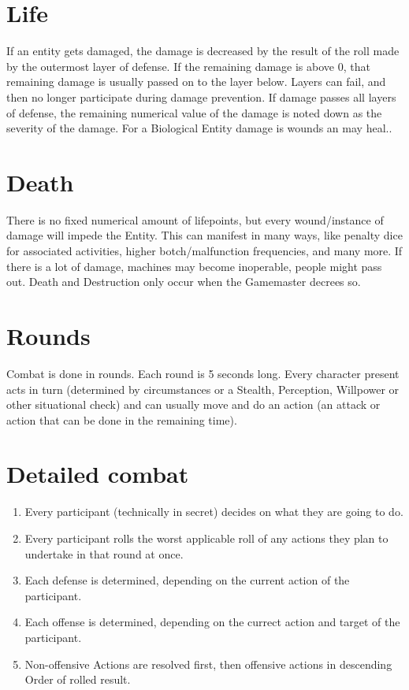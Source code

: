 \section{Life}\label{sec:life}
If an entity gets damaged, the damage is decreased by the result of the roll made by the outermost layer of defense.
If the remaining damage is above 0, that remaining damage is usually passed on to the layer below.
Layers can fail, and then no longer participate during damage prevention.
If damage passes all layers of defense,
the remaining numerical value of the damage is noted down as the severity of the damage.
For a Biological Entity damage is wounds an may heal..
\section{Death}\label{sec:death}
There is no fixed numerical amount of lifepoints, but every wound/instance of damage will impede the Entity.
This can manifest in many ways, like penalty dice for associated activities, higher botch/malfunction frequencies,
and many more.
If there is a lot of damage, machines may become inoperable, people might pass out.
Death and Destruction only occur when the Gamemaster decrees so.
\section{Rounds}\label{sec:rounds}
Combat is done in rounds.
Each round is 5 seconds long.
Every character present acts in turn (determined by circumstances or a Stealth, Perception, Willpower or other
situational check) and can usually move and do an action (an attack or action that can be done in the remaining time).
\section{Detailed combat}\label{sec:detailed-combat}
\begin{enumerate}
    \item Every participant (technically in secret) decides on what they are going to do.
    \item Every participant rolls the worst applicable roll of any actions they plan to undertake in that round at once.
    \item Each defense is determined, depending on the current action of the participant.
    \item Each offense is determined, depending on the currect action and target of the participant.
    \item Non-offensive Actions are resolved first, then offensive actions in descending Order of rolled result.
\end{enumerate}

